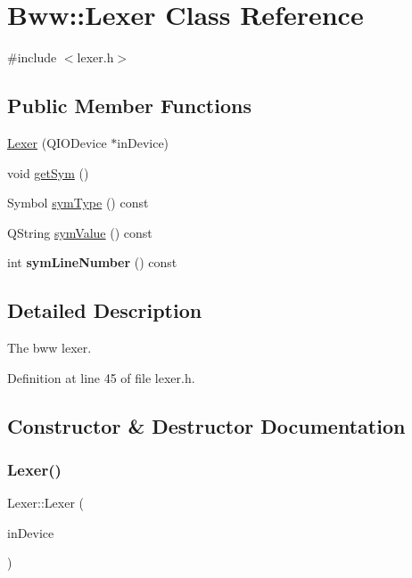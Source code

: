 \hypertarget{class_bww_1_1_lexer}{}\section{Bww\+:\+:Lexer Class Reference}
\label{class_bww_1_1_lexer}


{\ttfamily \#include $<$lexer.\+h$>$}

\subsection*{Public Member Functions}
\begin{DoxyCompactItemize}
\item 
\hyperlink{class_bww_1_1_lexer_ac2227bb646320ae97b4aaa99825bf66f}{Lexer} (Q\+I\+O\+Device $\ast$in\+Device)
\item 
void \hyperlink{class_bww_1_1_lexer_a2049b1ff9fef46bbd0cfd38ac32b1f2a}{get\+Sym} ()
\item 
Symbol \hyperlink{class_bww_1_1_lexer_a3182277744cedcec7c5d390ed3be128d}{sym\+Type} () const
\item 
Q\+String \hyperlink{class_bww_1_1_lexer_ab325630a55c0a1f537d44d9f78b9f914}{sym\+Value} () const
\item 
\mbox{\label{class_bww_1_1_lexer_a6022cbc623564c100ad7ead2c34d8086}} 
int {\bfseries sym\+Line\+Number} () const
\end{DoxyCompactItemize}


\subsection{Detailed Description}
The bww lexer. 

Definition at line 45 of file lexer.\+h.



\subsection{Constructor \& Destructor Documentation}
\mbox{\label{class_bww_1_1_lexer_ac2227bb646320ae97b4aaa99825bf66f}} 
\subsubsection{\texorpdfstring{Lexer()}{Lexer()}}
{\footnotesize\ttfamily Lexer\+::\+Lexer (\begin{DoxyParamCaption}\item[{Q\+I\+O\+Device $\ast$}]{in\+Device }\end{DoxyParamCaption})}

